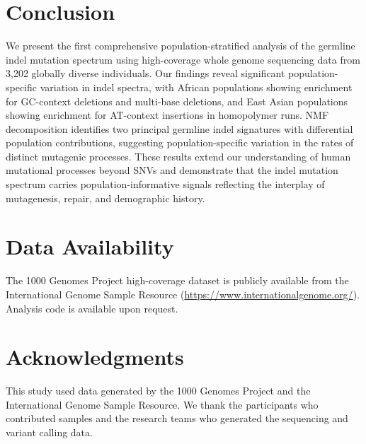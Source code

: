 \documentclass[11pt,a4paper]{article}
\begin{document}
\section{Conclusion}

We present the first comprehensive population-stratified analysis of the germline indel mutation spectrum using high-coverage whole genome sequencing data from 3,202 globally diverse individuals. Our findings reveal significant population-specific variation in indel spectra, with African populations showing enrichment for GC-context deletions and multi-base deletions, and East Asian populations showing enrichment for AT-context insertions in homopolymer runs. NMF decomposition identifies two principal germline indel signatures with differential population contributions, suggesting population-specific variation in the rates of distinct mutagenic processes. These results extend our understanding of human mutational processes beyond SNVs and demonstrate that the indel mutation spectrum carries population-informative signals reflecting the interplay of mutagenesis, repair, and demographic history.

\section*{Data Availability}

The 1000 Genomes Project high-coverage dataset is publicly available from the International Genome Sample Resource (\url{https://www.internationalgenome.org/}). Analysis code is available upon request.

\section*{Acknowledgments}

This study used data generated by the 1000 Genomes Project and the International Genome Sample Resource. We thank the participants who contributed samples and the research teams who generated the sequencing and variant calling data.


\end{document}
